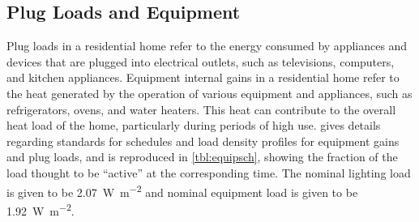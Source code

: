 \subsection{Plug Loads and Equipment}
Plug loads in a residential home refer to the energy consumed by appliances and devices that are plugged into electrical outlets, such as televisions, computers, and kitchen appliances. Equipment internal gains in a residential home refer to the heat generated by the operation of various equipment and appliances, such as refrigerators, ovens, and water heaters. This heat can contribute to the overall heat load of the home, particularly during periods of high use.  gives details regarding standards for schedules and load density profiles for equipment gains and plug loads, and is reproduced in \cref{tbl:equipsch}, showing the fraction of the load thought to be ``active'' at the corresponding time. The nominal lighting load is given to be \qty{2.07}{\watt\per\square\meter} and nominal equipment load is given to be \qty{1.92}{\watt\per\square\meter}.

